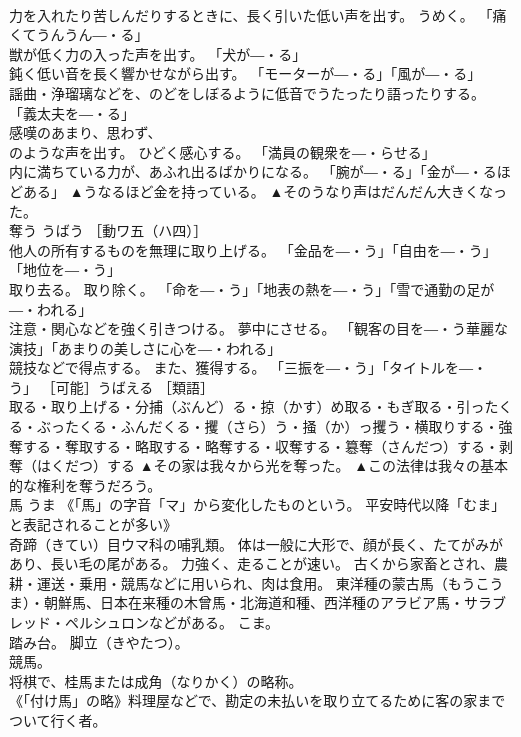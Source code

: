 \documentclass[8pt]{extreport}
\begin{document}
\begin{CJK}{UTF8}{min}
\\	力を入れたり苦しんだりするときに、長く引いた低い声を出す。 うめく。 「痛くてうんうん―・る」 
\\	獣が低く力の入った声を出す。 「犬が―・る」 
\\	鈍く低い音を長く響かせながら出す。 「モーターが―・る」「風が―・る」 
\\	謡曲・浄瑠璃などを、のどをしぼるように低音でうたったり語ったりする。 「義太夫を―・る」 
\\	感嘆のあまり、思わず、 
\\	のような声を出す。 ひどく感心する。 「満員の観衆を―・らせる」 
\\	内に満ちている力が、あふれ出るばかりになる。 「腕が―・る」「金が―・るほどある」	▲うなるほど金を持っている。 ▲そのうなり声はだんだん大きくなった。
\\	奪う	うばう	［動ワ五（ハ四）］ 
\\	他人の所有するものを無理に取り上げる。 「金品を―・う」「自由を―・う」「地位を―・う」 
\\	取り去る。 取り除く。 「命を―・う」「地表の熱を―・う」「雪で通勤の足が―・われる」 
\\	注意・関心などを強く引きつける。 夢中にさせる。 「観客の目を―・う華麗な演技」「あまりの美しさに心を―・われる」 
\\	競技などで得点する。 また、獲得する。 「三振を―・う」「タイトルを―・う」 ［可能］うばえる ［類語］
\\	取る・取り上げる・分捕（ぶんど）る・掠（かす）め取る・もぎ取る・引ったくる・ぶったくる・ふんだくる・攫（さら）う・掻（か）っ攫う・横取りする・強奪する・奪取する・略取する・略奪する・収奪する・簒奪（さんだつ）する・剥奪（はくだつ）する	▲その家は我々から光を奪った。 ▲この法律は我々の基本的な権利を奪うだろう。
\\	馬	うま	《「馬」の字音「マ」から変化したものという。 平安時代以降「むま」と表記されることが多い》 
\\	奇蹄（きてい）目ウマ科の哺乳類。 体は一般に大形で、顔が長く、たてがみがあり、長い毛の尾がある。 力強く、走ることが速い。 古くから家畜とされ、農耕・運送・乗用・競馬などに用いられ、肉は食用。 東洋種の蒙古馬（もうこうま）・朝鮮馬、日本在来種の木曾馬・北海道和種、西洋種のアラビア馬・サラブレッド・ペルシュロンなどがある。 こま。 
\\	踏み台。 脚立（きやたつ）。 
\\	競馬。 
\\	将棋で、桂馬または成角（なりかく）の略称。 
\\	《「付け馬」の略》料理屋などで、勘定の未払いを取り立てるために客の家までついて行く者。 

\end{CJK}
\end{document}
